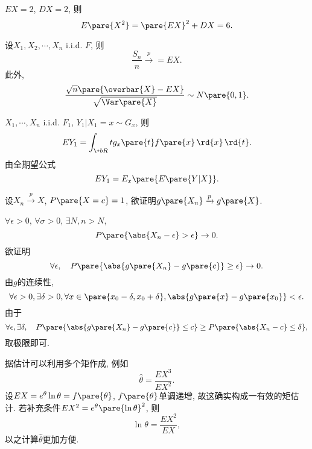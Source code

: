 \documentclass{ctexart}
\begin{document}
\begin{sample}
    \begin{ex}
        $EX = 2$, $DX = 2$, 则
        \[ E\pare{X^2} = \pare{EX}^2 + DX = 6. \]
    \end{ex}
\end{sample}
    \begin{theorem}
        设$X_1,X_2,\cdots,X_n$ i.i.d. $F$, 则
        \[ \frac{S_n}{n} \xrightarrow{p} = EX. \]
        此外,
        \[ \frac{\sqrt{n}\pare{\overbar{X} - EX}}{\sqrt{\Var\pare{X}}} \sim N\pare{0,1}. \]
    \end{theorem}
\begin{sample}
    \begin{ex}
        $X_1,\cdots,X_n$ i.i.d. $F_1$, $Y_1\vert X_1 = x \sim G_x$, 则
        \[ EY_1 = \int_{\+bR}tg_x\pare{t}f\pare{x}\,\rd{x}\,\rd{t}. \]
        由全期望公式
        \[ EY_1 = E_x\pare{E\pare{Y\vert X}}. \]
    \end{ex}
\end{sample}
\begin{sample}
    \begin{ex}
        设$X_n\xrightarrow{p} X$, $P\pare{X=c} = 1$, 欲证明$g\pare{X_n}\xrightarrow{p} g\pare{X}$.
    \end{ex}
    \begin{solution}
        $\forall \epsilon>0$, $\forall \sigma>0$, $\exists N, n>N$,
        \[ P\pare{\abs{X_n - \epsilon} > \epsilon} \rightarrow 0. \]
        欲证明
        \[ \forall \epsilon, \quad P\pare{\abs{g\pare{X_n} - g\pare{c}} \ge \epsilon} \rightarrow 0. \]
        由$g$的连续性,
        \[ \forall \epsilon>0, \exists \delta > 0, \forall x\in\pare{x_0 - \delta,x_0 + \delta}, \abs{g\pare{x} - g\pare{x_0}} < \epsilon. \]
        由于
        \[ \forall \epsilon, \exists \delta,\quad P\pare{\abs{g\pare{X_n} - g\pare{c}}\le c} \ge P\pare{\abs{X_n-c}\le \delta}, \]
        取极限即可.
    \end{solution}
\end{sample}
据估计可以利用多个矩作成, 例如
\[ \hat\theta = \frac{EX^3}{EX^2}. \]
设$EX = e^\theta \ln\theta = f\pare{\theta}$, $f\pare{\theta}$单调递增, 故这确实构成一有效的矩估计. 若补充条件$EX^2 = e^\theta \pare{\ln\theta}^2$, 则
\[ \ln \theta = \frac{EX^2}{EX}, \]
以之计算$\hat\theta$更加方便.
\end{document}
